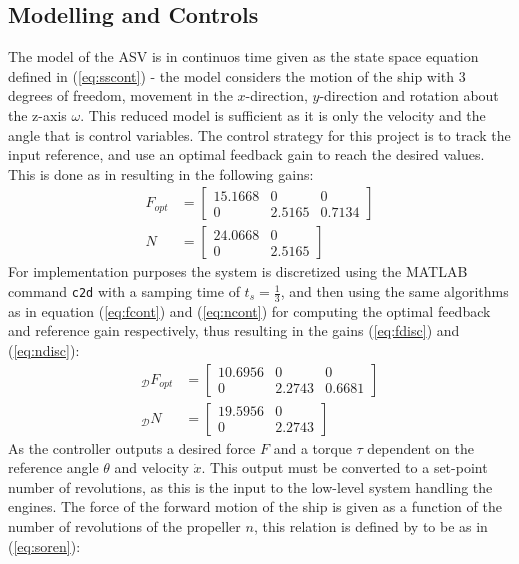 \documentclass{ifacconf}
\begin{document}
\subsection{Modelling and Controls}
The model of the ASV is in continuos time given as the state space equation defined in (\ref{eq:sscont}) - the model considers the motion of the ship with 3 degrees of freedom, movement in the $x$-direction, $y$-direction and rotation about the z-axis $\omega$. This reduced model is sufficient as it is only the velocity and the angle that is control variables. The control strategy for this project is to track the input reference, and use an optimal feedback gain to reach the desired values. This is done as in \cite{feedback} resulting in the following gains:
\begin{align}
F_{opt} &= \begin{bmatrix}
15.1668 & 0 & 0\\
0 & 2.5165 & 0.7134
\end{bmatrix}\label{eq:fcont}\\
N &=  \begin{bmatrix}
24.0668 & 0\\
0 & 2.5165
\end{bmatrix}\label{eq:ncont}
\end{align}
For implementation purposes the system is discretized using the MATLAB command \texttt{c2d} with a samping time of $t_s = \frac{1}{3}$, and then using the same algorithms as in equation (\ref{eq:fcont}) and (\ref{eq:ncont}) for computing the optimal feedback and reference gain respectively, thus resulting in the gains (\ref{eq:fdisc}) and (\ref{eq:ndisc}):
\begin{align}
_\mathcal{D}F_{opt} &= \begin{bmatrix}
10.6956 & 0 & 0\\
0 & 2.2743 & 0.6681
\end{bmatrix}\label{eq:fdisc}\\
_\mathcal{D}N &=  \begin{bmatrix}
19.5956 & 0\\
0 & 2.2743
\end{bmatrix}\label{eq:ndisc}
\end{align}
As the controller outputs a desired force $F$ and a torque $\tau$ dependent on the reference angle $\theta$ and velocity $\dot{x}$. This output must be converted to a set-point number of revolutions, as this is the input to the low-level system handling the engines. The force of the forward motion of the ship is given as a function of the number of revolutions of the propeller $n$, this relation is defined by \cite{cyber} to be as in (\ref{eq:soren}):
\end{document}
